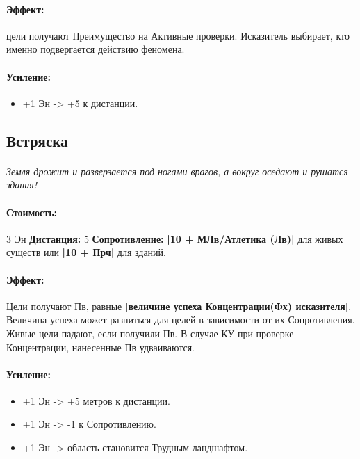 \paragraph{Эффект: }цели получают Преимущество на Активные проверки. Исказитель выбирает, кто именно подвергается действию феномена.
\paragraph{Усиление:}
\begin{itemize}
\item+1 Эн -> +5 к дистанции.
\end{itemize}
\subsection{Встряска}
\paragraph{} 
\textit{Земля дрожит и разверзается под ногами врагов, а вокруг оседают и рушатся здания!}
\paragraph{Стоимость: }3 Эн
\newline
\textbf{Дистанция: }5
\newline
\textbf{Сопротивление: }
\textbf{|10 + МЛв/Атлетика (Лв)|} для живых существ или 
\textbf{|10 + Прч|} для зданий.
\paragraph{Эффект: }Цели получают Пв, равные 
\textbf{|величине успеха Концентрации(Фх) исказителя|}. Величина успеха может разниться для целей в зависимости от их Сопротивления. 
\newline Живые цели падают, если получили Пв. 
\newline В случае КУ при проверке Концентрации, нанесенные Пв удваиваются.
\paragraph{Усиление:}
\begin{itemize}
\item+1 Эн -> +5 метров к дистанции.
\item+1 Эн -> -1 к Сопротивлению.
\item+1 Эн -> область становится Трудным ландшафтом.
\end{itemize}
